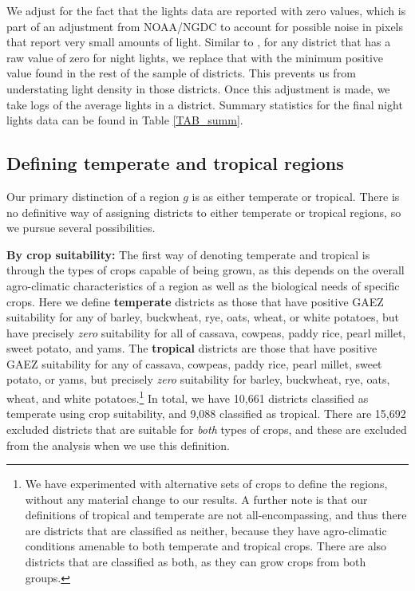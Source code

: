 \documentclass[11pt]{article}
\begin{document}
We adjust for the fact that the lights data are reported with zero values, which is part of an adjustment from NOAA/NGDC to account for possible noise in pixels that report very small amounts of light. Similar to \citet{hssw2016}, for any district that has a raw value of zero for night lights, we replace that with the minimum positive value found in the rest of the sample of districts. This prevents us from understating light density in those districts. Once this adjustment is made, we take logs of the average lights in a district. Summary statistics for the final night lights data can be found in Table \ref{TAB_summ}.

\subsection{Defining temperate and tropical regions}
Our primary distinction of a region $g$ is as either temperate or tropical. There is no definitive way of assigning districts to either temperate or tropical regions, so we pursue several possibilities. 

\vspace{.5cm}\noindent\textbf{By crop suitability:} The first way of denoting temperate and tropical is through the types of crops capable of being grown, as this depends on the overall agro-climatic characteristics of a region as well as the biological needs of specific crops. Here we define \textbf{temperate} districts as those that have positive GAEZ suitability for any of barley, buckwheat, rye, oats, wheat, or white potatoes, but have precisely \textit{zero} suitability for all of cassava, cowpeas, paddy rice, pearl millet, sweet potato, and yams. The \textbf{tropical} districts are those that have positive GAEZ suitability for any of cassava, cowpeas, paddy rice, pearl millet, sweet potato, or yams, but precisely \textit{zero} suitability for barley, buckwheat, rye, oats, wheat, and white potatoes.\footnote{We have experimented with alternative sets of crops to define the regions, without any material change to our results. A further note is that our definitions of tropical and temperate are not all-encompassing, and thus there are districts that are classified as neither, because they have agro-climatic conditions amenable to both temperate and tropical crops. There are also districts that are classified as both, as they can grow crops from both groups.} In total, we have 10,661 districts classified as temperate using crop suitability, and 9,088 classified as tropical. There are 15,692 excluded districts that are suitable for \textit{both} types of crops, and these are excluded from the analysis when we use this definition.
\end{document}
